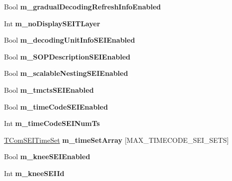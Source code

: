 \begin{DoxyCompactItemize}
Bool {\bfseries m\+\_\+gradual\+Decoding\+Refresh\+Info\+Enabled}
\item 
\mbox{\label{class_t_app_enc_cfg_a275cb7135b114c93688f37042bdee586}} 
Int {\bfseries m\+\_\+no\+Display\+S\+E\+I\+T\+Layer}
\item 
\mbox{\label{class_t_app_enc_cfg_ab9e7d813444cb99ab1a71d677bebd0e2}} 
Bool {\bfseries m\+\_\+decoding\+Unit\+Info\+S\+E\+I\+Enabled}
\item 
\mbox{\label{class_t_app_enc_cfg_a4884c47f921a0abd2d12acd1adfd00b9}} 
Bool {\bfseries m\+\_\+\+S\+O\+P\+Description\+S\+E\+I\+Enabled}
\item 
\mbox{\label{class_t_app_enc_cfg_a2b16747b43d0d8743c9c144a674aaba4}} 
Bool {\bfseries m\+\_\+scalable\+Nesting\+S\+E\+I\+Enabled}
\item 
\mbox{\label{class_t_app_enc_cfg_ad3ec5d8dc7e75f1f33cc0ea0e95c648d}} 
Bool {\bfseries m\+\_\+tmcts\+S\+E\+I\+Enabled}
\item 
\mbox{\label{class_t_app_enc_cfg_aed13c51f2d27f7a6534a25d0b2023b33}} 
Bool {\bfseries m\+\_\+time\+Code\+S\+E\+I\+Enabled}
\item 
\mbox{\label{class_t_app_enc_cfg_a43119a13e6143bd300ed3a36f3526cdf}} 
Int {\bfseries m\+\_\+time\+Code\+S\+E\+I\+Num\+Ts}
\item 
\mbox{\label{class_t_app_enc_cfg_aec5a98841658097c8ac5b5301334a54d}} 
\hyperlink{struct_t_com_s_e_i_time_set}{T\+Com\+S\+E\+I\+Time\+Set} {\bfseries m\+\_\+time\+Set\+Array} \mbox{[}M\+A\+X\+\_\+\+T\+I\+M\+E\+C\+O\+D\+E\+\_\+\+S\+E\+I\+\_\+\+S\+E\+TS\mbox{]}
\item 
\mbox{\label{class_t_app_enc_cfg_ac16a2f95e0eec0733abd04b98970527a}} 
Bool {\bfseries m\+\_\+knee\+S\+E\+I\+Enabled}
\item 
\mbox{\label{class_t_app_enc_cfg_a6ccfff2c0970a04a3a93a6d4927f2591}} 
Int {\bfseries m\+\_\+knee\+S\+E\+I\+Id}
\item 

\end{DoxyCompactItemize}
